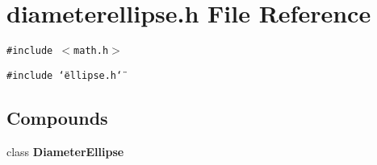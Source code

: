 \section{diameterellipse.h File Reference}
\label{diameterellipse_8h}
{\tt \#include $<$math.h$>$}\par
{\tt \#include \char`\"{}ellipse.h\char`\"{}}\par
\subsection*{Compounds}
\begin{CompactItemize}
\item 
class {\bf Diameter\-Ellipse}
\end{CompactItemize}
